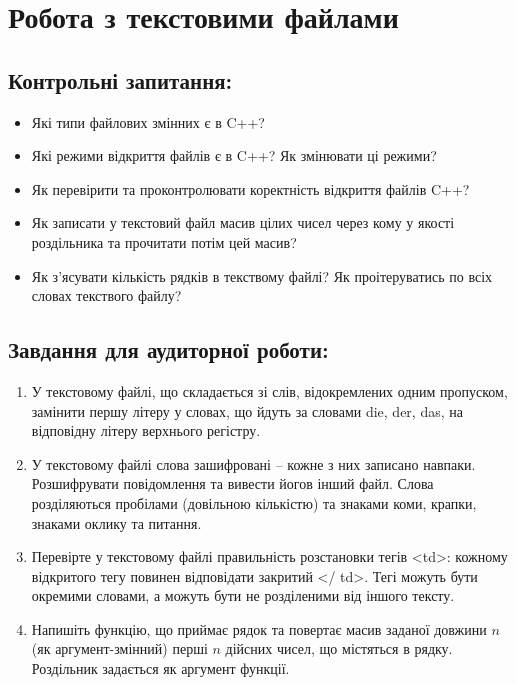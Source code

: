 \documentclass[a5paper,titlepage,openany,twoside,draft]{book_unv}%
\begin{document}
\chapter{Робота з текстовими файлами}
%

\section{Контрольні запитання:}
\begin{itemize}
\item
 Які типи файлових змінних є в C++?
\item
 Які режими відкриття файлів є в C++? Як змінювати ці режими?
\item
 Як перевірити та проконтролювати коректність відкриття файлів C++?
\item
  Як записати у текстовий файл масив цілих чисел через кому у якості
  роздільника та прочитати потім цей масив?
\item
  Як з'ясувати кількість рядків в текствому файлі? Як проітеруватись по всіх
словах текствого файлу?

\end{itemize}

\section{Завдання для аудиторної роботи:}

\begin{enumerate}
\def\labelenumi{\arabic{enumi})}
\item
  У текстовому файлі, що складається зі слів, відокремлених одним пропуском,
  замінити першу літеру у словах, що йдуть за словами die, der, das, на
  відповідну літеру верхнього регістру.
\item
  У текстовому файлі слова зашифровані -- кожне з них записано навпаки.
  Розшифрувати повідомлення та вивести йогов інший файл. 
 Слова розділяються пробілами (довільною кількістю)
  та знаками коми, крапки, знаками оклику та питання. 
\item
 Перевірте у текстовому файлі правильність
  розстановки тегів \textless{}td\textgreater{}: кожному відкритого тегу
  повинен відповідати закритий \textless{}/ td\textgreater{}. Тегі можуть бути
окремими словами, а можуть бути  не розділеними від іншого тексту.

\item
  Напишіть функцію, що приймає рядок та повертає масив заданої довжини $n$ (як
  аргумент-змінний) перші $n$ дійсних чисел, що містяться в рядку. Роздільник
  задається як аргумент функції.
\end{enumerate}
\end{document}
